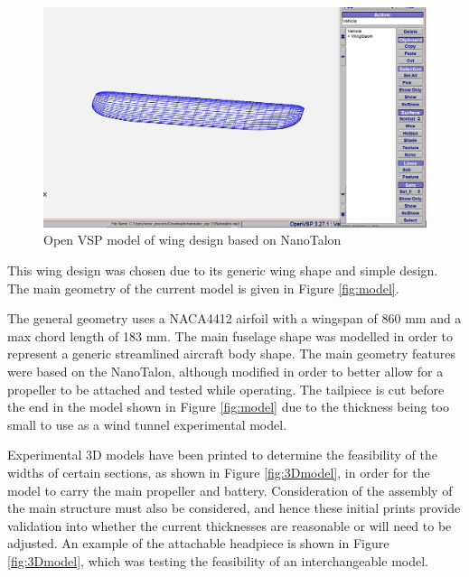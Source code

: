 \begin{figure}[H]
    \centering
    \includegraphics[width=\linewidth]{04_Progress/Figs/openVSp.JPG}
    \caption{Open VSP model of wing design based on NanoTalon \cite{NanoTalon}}
    \label{fig:openVSP}
\end{figure}

This wing design was chosen due to its generic wing shape and simple design. The main geometry of the current model is given in Figure \ref{fig:model}.



The general geometry uses a NACA4412 airfoil with a wingspan of 860 mm and a max chord length of 183 mm. The main fuselage shape was modelled in order to represent a generic streamlined aircraft body shape. The main geometry features were based on the NanoTalon, although modified in order to better allow for a propeller to be attached and tested while operating. The tailpiece is cut before the end in the model shown in Figure \ref{fig:model} due to the thickness being too small to use as a wind tunnel experimental model.

Experimental 3D models have been printed to determine the feasibility of the widths of certain sections, as shown in Figure \ref{fig:3Dmodel}, in order for the model to carry the main propeller and battery. Consideration of the assembly of the main structure must also be considered, and hence these initial prints provide validation into whether the current thicknesses are reasonable or will need to be adjusted. An example of the attachable headpiece is shown in Figure \ref{fig:3Dmodel}, which was testing the feasibility of an interchangeable model. 

